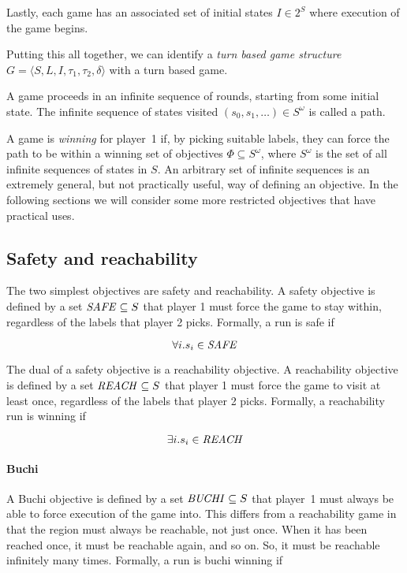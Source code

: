 Lastly, each game has an associated set of initial states $I \in 2^S$ where execution of the game begins.

Putting this all together, we can identify a \emph{turn based game structure} $G = \langle S,L,I,\tau_1,\tau_2,\delta \rangle$ with a turn based game.

A game proceeds in an infinite sequence of rounds, starting from some initial state. The infinite sequence of states visited $(s_0, s_1,\ldots) \in S^\omega$ is called a path. 

A game is \emph{winning} for player~1 if, by picking suitable labels, they can force the path to be within a winning set of objectives $\Phi \subseteq S^\omega$, where $S^\omega$ is the set of all infinite sequences of states in $S$. An arbitrary set of infinite sequences is an extremely general, but not practically useful, way of defining an objective. In the following sections we will consider some more restricted objectives that have practical uses.

\subsection{Safety and reachability}

The two simplest objectives are safety and reachability. A safety objective is defined by a set $\mathit{SAFE} \subseteq S$ that player 1 must force the game to stay within, regardless of the labels that player 2 picks. Formally, a run is safe if 

\begin{equation}
\forall i. s_i \in \mathit{SAFE}
\end{equation}

The dual of a safety objective is a reachability objective. A reachability objective is defined by a set $\mathit{REACH} \subseteq S$ that player 1 must force the game to visit at least once, regardless of the labels that player 2 picks. Formally, a reachability run is winning if 

\begin{equation}
\exists i. s_i \in \mathit{REACH}
\end{equation}

\paragraph{Buchi}
A Buchi objective is defined by a set $\mathit{BUCHI} \subseteq S$ that player~1 must always be able to force execution of the game into. This differs from a reachability game in that the region must always be reachable, not just once. When it has been reached once, it must be reachable again, and so on. So, it must be reachable infinitely many times. Formally, a run is buchi winning if 

